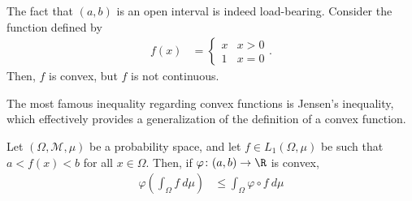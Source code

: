 \documentclass[12pt]{mypackage}
\begin{document}
\begin{remark}
  The fact that $\left( a,b \right)$ is an open interval is indeed load-bearing. Consider the function defined by
  \begin{align*}
    f\left( x \right) &= \begin{cases}
      x & x > 0\\
      1 & x = 0
    \end{cases}.
  \end{align*}
  Then, $f$ is convex, but $f$ is not continuous.
\end{remark}
The most famous inequality regarding convex functions is Jensen's inequality, which effectively provides a generalization of the definition of a convex function.
\begin{theorem}
  Let $\left( \Omega,\mathcal{M},\mu \right)$ be a probability space, and let $f\in L_1\left( \Omega,\mu \right)$ be such that $a < f(x) < b$ for all $x\in \Omega$. Then, if $\varphi\colon (a,b)\rightarrow \R$ is convex,
  \begin{align*}
    \varphi\left( \int_{\Omega}^{} f\:d\mu \right) &\leq \int_{\Omega}^{} \varphi\circ f\:d\mu
  \end{align*}
\end{theorem}
\end{document}
